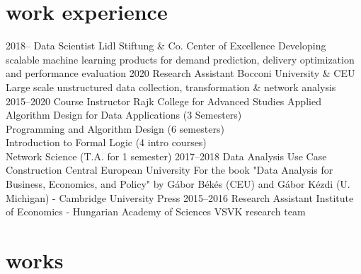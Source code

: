 \documentclass[]{friggeri-cv}
\begin{document}
\section{work experience}

\begin{entrylist}
\entry
{2018--}
{Data Scientist}
{Lidl Stiftung \& Co. Center of Excellence}
{Developing scalable machine learning products for demand prediction, delivery optimization and performance evaluation}
\entry
{2020}
{Research Assistant}
{Bocconi University \& CEU}
{Large scale unstructured data collection, transformation \& network analysis}
\entry
{2015--2020}
{Course Instructor}
{Rajk College for Advanced Studies}
{Applied Algorithm Design for Data Applications (3 Semesters) \\
 Programming and Algorithm Design (6 semesters) \\
 Introduction to Formal Logic (4 intro courses) \\
 Network Science (T.A. for 1 semester)}
\entry
{2017--2018}
{Data Analysis Use Case Construction}
{Central European University}
{For the book "Data Analysis for Business, Economics, and Policy" by 
Gábor Békés (CEU) and Gábor Kézdi (U. Michigan) - Cambridge University Press}
\entry
{2015--2016}
{Research Assistant}
{Institute of Economics - Hungarian Academy of Sciences}
{VSVK research team}
\end{entrylist}

\section{works}
\end{document}
